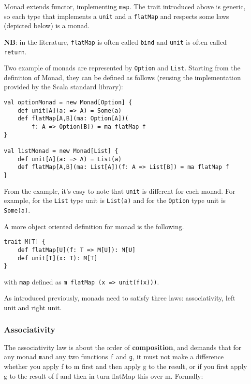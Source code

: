 Monad extends functor, implementing \texttt{map}. The trait introduced
above is generic, so each type that implements a \texttt{unit} and a
\texttt{flatMap} and respects some laws (depicted below) is a monad.

\textbf{NB}: in the literature, \texttt{flatMap} is often called
\texttt{bind} and \texttt{unit} is often called \texttt{return}.

Two example of monads are represented by \texttt{Option} and
\texttt{List}. Starting from the definition of Monad, they can be
defined as follows (reusing the implementation provided by the Scala
standard library):

\begin{verbatim}
val optionMonad = new Monad[Option] {
    def unit[A](a: => A) = Some(a)
    def flatMap[A,B](ma: Option[A])(
    	f: A => Option[B]) = ma flatMap f
}

val listMonad = new Monad[List] {
    def unit[A](a: => A) = List(a)
    def flatMap[A,B](ma: List[A])(f: A => List[B]) = ma flatMap f
}
\end{verbatim}

From the example, it's easy to note that \texttt{unit} is different for
each monad. For example, for the \texttt{List} type unit is
\texttt{List(a)} and for the \texttt{Option} type unit is
\texttt{Some(a)}.

A more object oriented definition for monad is the following.

\begin{verbatim}
trait M[T] {
    def flatMap[U](f: T => M[U]): M[U]
    def unit[T](x: T): M[T]
}
\end{verbatim}

with \texttt{map} defined as
\texttt{m\ flatMap\ (x\ =\textgreater{}\ unit(f(x)))}.

As introduced previously, monads need to satisfy three laws:
associativity, left unit and right unit.

\subsubsection{Associativity}\label{associativity}

The associativity law is about the order of \textbf{composition}, and
demands that for any monad \texttt{m}and any two functions \texttt{f}
and \texttt{g}, it must not make a difference whether you apply f to m
first and then apply g to the result, or if you first apply g to the
result of f and then in turn flatMap this over m. Formally:


